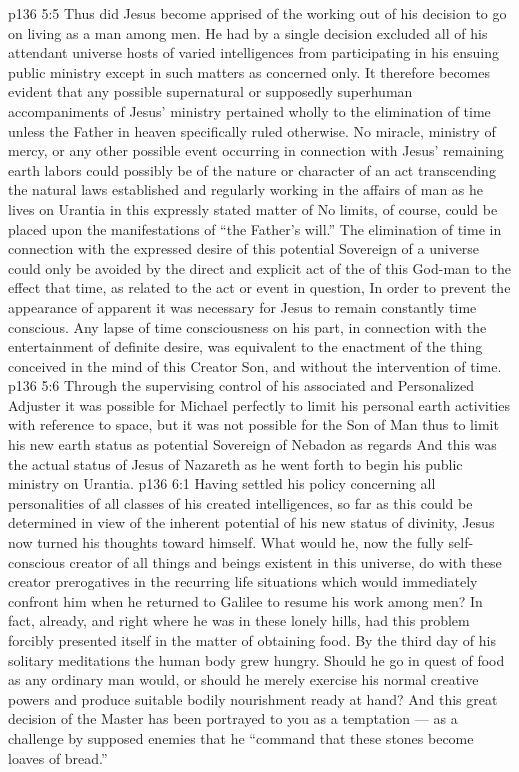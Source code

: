\vs p136 5:5 \pc Thus did Jesus become apprised of the working out of his decision to go on living as a man among men. He had by a single decision excluded all of his attendant universe hosts of varied intelligences from participating in his ensuing public ministry except in such matters as concerned  only. It therefore becomes evident that any possible supernatural or supposedly superhuman accompaniments of Jesus’ ministry pertained wholly to the elimination of time unless the Father in heaven specifically ruled otherwise. No miracle, ministry of mercy, or any other possible event occurring in connection with Jesus’ remaining earth labors could possibly be of the nature or character of an act transcending the natural laws established and regularly working in the affairs of man as he lives on Urantia  in this expressly stated matter of  No limits, of course, could be placed upon the manifestations of “the Father’s will.” The elimination of time in connection with the expressed desire of this potential Sovereign of a universe could only be avoided by the direct and explicit act of the  of this God\hyp{}man to the effect that time, as related to the act or event in question,  In order to prevent the appearance of apparent  it was necessary for Jesus to remain constantly time conscious. Any lapse of time consciousness on his part, in connection with the entertainment of definite desire, was equivalent to the enactment of the thing conceived in the mind of this Creator Son, and without the intervention of time.
\vs p136 5:6 Through the supervising control of his associated and Personalized Adjuster it was possible for Michael perfectly to limit his personal earth activities with reference to space, but it was not possible for the Son of Man thus to limit his new earth status as potential Sovereign of Nebadon as regards  And this was the actual status of Jesus of Nazareth as he went forth to begin his public ministry on Urantia.
\vs p136 6:1 Having settled his policy concerning all personalities of all classes of his created intelligences, so far as this could be determined in view of the inherent potential of his new status of divinity, Jesus now turned his thoughts toward himself. What would he, now the fully self\hyp{}conscious creator of all things and beings existent in this universe, do with these creator prerogatives in the recurring life situations which would immediately confront him when he returned to Galilee to resume his work among men? In fact, already, and right where he was in these lonely hills, had this problem forcibly presented itself in the matter of obtaining food. By the third day of his solitary meditations the human body grew hungry. Should he go in quest of food as any ordinary man would, or should he merely exercise his normal creative powers and produce suitable bodily nourishment ready at hand? And this great decision of the Master has been portrayed to you as a temptation --- as a challenge by supposed enemies that he “command that these stones become loaves of bread.”
